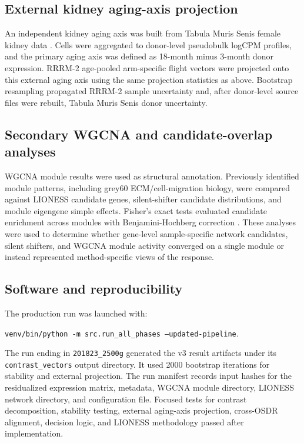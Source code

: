 \documentclass[11pt]{article}
\newcommand{\code}[1]{\texttt{#1}}
\begin{document}
\subsection{External kidney aging-axis projection}

An independent kidney aging axis was built from Tabula Muris Senis female kidney data \citep{tabula2020}. Cells were aggregated to donor-level pseudobulk logCPM profiles, and the primary aging axis was defined as 18-month minus 3-month donor expression. RRRM-2 age-pooled arm-specific flight vectors were projected onto this external aging axis using the same projection statistics as above. Bootstrap resampling propagated RRRM-2 sample uncertainty and, after donor-level source files were rebuilt, Tabula Muris Senis donor uncertainty.

\subsection{Secondary WGCNA and candidate-overlap analyses}

WGCNA module results were used as structural annotation. Previously identified module patterns, including grey60 ECM/cell-migration biology, were compared against LIONESS candidate genes, silent-shifter candidate distributions, and module eigengene simple effects. Fisher's exact tests evaluated candidate enrichment across modules with Benjamini-Hochberg correction \citep{benjamini1995controlling}. These analyses were used to determine whether gene-level sample-specific network candidates, silent shifters, and WGCNA module activity converged on a single module or instead represented method-specific views of the response.

\subsection{Software and reproducibility}

The production run was launched with:
\begin{center}
\code{venv/bin/python -m src.run\_all\_phases --updated-pipeline}.
\end{center}
The run ending in \code{201823\_2500g} generated the v3 result artifacts under its \code{contrast\_vectors} output directory. It used 2000 bootstrap iterations for stability and external projection. The run manifest records input hashes for the residualized expression matrix, metadata, WGCNA module directory, LIONESS network directory, and configuration file. Focused tests for contrast decomposition, stability testing, external aging-axis projection, cross-OSDR alignment, decision logic, and LIONESS methodology passed after implementation.
\end{document}
